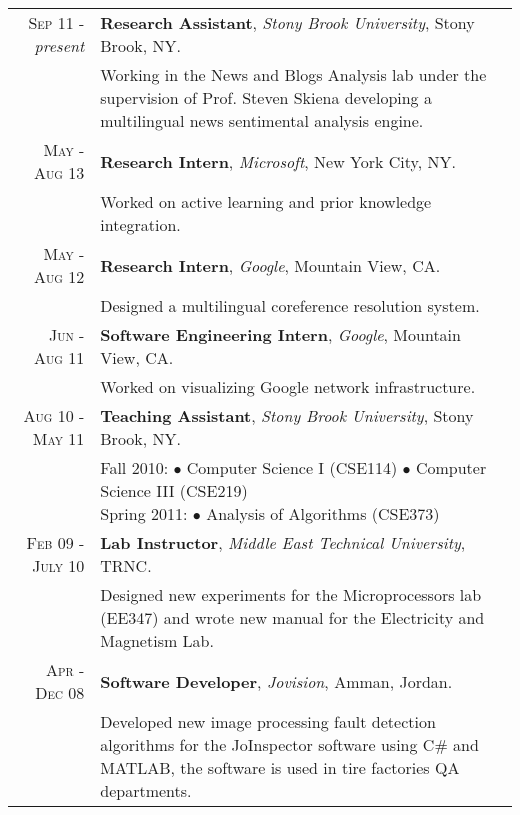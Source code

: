 \documentclass[a4paper, oneside, final]{scrartcl}
\newcommand{\twidthb}{12.65cm}
\begin{document}
\begin{tabular}{rm{\twidthb}}
\textsc{Sep 11} - \emph{present}  & \textbf{Research Assistant}, \emph{Stony Brook University}, Stony Brook, NY. \\
                    & \footnotesize{\parbox{\twidthb}{Working in the News and
Blogs Analysis lab under the supervision of Prof. Steven Skiena developing a multilingual news sentimental analysis engine.}}

\\\textsc{May - Aug 13}  & \textbf{Research Intern}, \emph{Microsoft}, New York City, NY. \\                    
 & \footnotesize{\parbox{\twidthb}{Worked on active learning and prior knowledge integration.}}


\\\textsc{May - Aug 12}  & \textbf{Research Intern}, \emph{Google}, Mountain View, CA. \\                    
 & \footnotesize{\parbox{\twidthb}{Designed a multilingual coreference resolution system.}}

\\\textsc{Jun - Aug 11}  & \textbf{Software Engineering Intern}, \emph{Google}, Mountain View, CA. \\
						& \footnotesize{\parbox{\twidthb}{Worked on visualizing Google network infrastructure.}}

\\\textsc{Aug 10 - May 11}  & \textbf{Teaching Assistant}, \emph{Stony Brook University}, Stony Brook, NY. \\
                    & \footnotesize{\parbox{\twidthb}{
                        Fall 2010:
                        $\bullet$ Computer Science I (CSE114)
                        $\bullet$ Computer Science III (CSE219)\\
                        Spring 2011: $\bullet$ Analysis of Algorithms (CSE373)}}

\\\textsc{Feb 09 - July 10}  & \textbf{Lab Instructor}, \emph{Middle East Technical University}, TRNC. \\
                    & \footnotesize{\parbox{\twidthb}{
                     Designed new experiments for the Microprocessors lab (EE347) and wrote new manual for the Electricity and Magnetism Lab.}}   

   \\ \textsc{Apr - Dec 08}  & \textbf{Software Developer}, \emph{Jovision}, Amman, Jordan. \\
                         & \footnotesize{Developed new image processing fault detection algorithms for the JoInspector software using C\# and MATLAB, the software is used in tire factories QA departments.}

\end{tabular}
\end{document}
